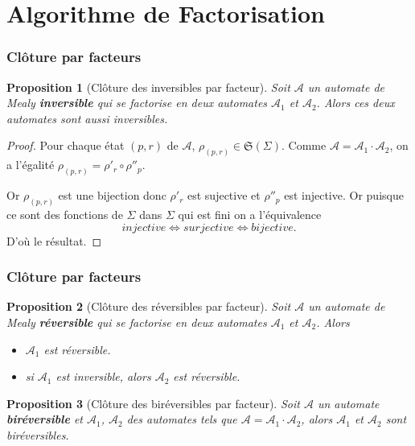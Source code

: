 \documentclass[11pt]{beamer}
\newtheorem{prop}{Proposition}
\begin{document}
\section{Algorithme de Factorisation}

\begin{frame}
  \frametitle{Clôture par facteurs}
  \begin{prop}[Clôture des inversibles par facteur]\label{prop_cloture_inv_facteurs}
    Soit $\mathcal{A}$ un automate de Mealy \textbf{inversible} qui se factorise en deux automates $\mathcal{A}_1$ et $\mathcal{A}_2$. Alors ces deux automates sont aussi inversibles.
  \end{prop}

  \begin{proof}
    Pour chaque état $(p, r)$ de $\mathcal{A}$, $\rho_{(p, r)}\in \mathfrak{S}(\Sigma)$. Comme $\mathcal{A}=\mathcal{A}_1\cdot\mathcal{A}_2$, on a l'égalité $\rho_{(p, r)}=\rho'_r\circ\rho''_p$.

    Or $\rho_{(p, r)}$ est une bijection donc $\rho'_r$ est sujective et $\rho''_p$ est injective. Or puisque ce sont des fonctions de $\Sigma$ dans $\Sigma$ qui est fini on a l'équivalence
    \[ injective \iff surjective \iff bijective. \]
    D'où le résultat.
  \end{proof}

\end{frame}

\begin{frame}
  \frametitle{Clôture par facteurs}
  \begin{prop}[Clôture des réversibles par facteur]\label{prop_cloture_rev_facteurs}
    Soit $\mathcal{A}$ un automate de Mealy \textbf{réversible} qui se factorise en deux automates $\mathcal{A}_1$ et $\mathcal{A}_2$. Alors
    \begin{itemize}
    \item $\mathcal{A}_1$ est réversible.
    \item si $\mathcal{A}_1$ est inversible, alors $\mathcal{A}_2$ est réversible.
    \end{itemize}
  \end{prop}

  \begin{prop}[Clôture des biréversibles par facteur]\label{prop:clot_birev}
    Soit $\mathcal{A}$ un automate \textbf{biréversible} et $\mathcal{A}_1$, $\mathcal{A}_2$ des automates tels que $\mathcal{A}=\mathcal{A}_1\cdot\mathcal{A}_2$, alors $\mathcal{A}_1$ et $\mathcal{A}_2$ sont biréversibles.
  \end{prop}

\end{frame}
\end{document}
